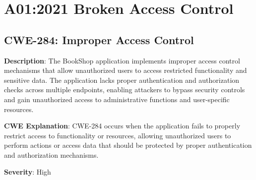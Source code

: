 \documentclass[]{UCD_CS_FYP_Report}
\begin{document}
\maketitle


\tableofcontents{}\newpage
\newpage



\chapter{A01:2021 Broken Access Control}


\section{CWE-284: Improper Access Control}

\textbf{Description}: The BookShop application implements improper access control mechanisms that allow unauthorized users to access restricted functionality and sensitive data. The application lacks proper authentication and authorization checks across multiple endpoints, enabling attackers to bypass security controls and gain unauthorized access to administrative functions and user-specific resources.

\textbf{CWE Explanation}: CWE-284 occurs when the application fails to properly restrict access to functionality or resources, allowing unauthorized users to perform actions or access data that should be protected by proper authentication and authorization mechanisms.

\textbf{Severity}: High
\end{document}
